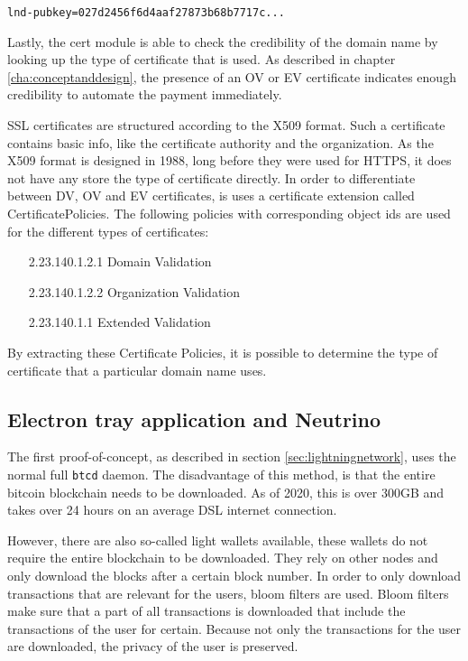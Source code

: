 \texttt{lnd-pubkey=027d2456f6d4aaf27873b68b7717c...}

Lastly, the cert module is able to check the credibility of the domain name by looking up the type of certificate that is used. As described in chapter \ref{cha:conceptanddesign}, the presence of an OV or EV certificate indicates enough credibility to automate the payment immediately. 

SSL certificates are structured according to the X509 format. Such a certificate contains basic info, like the certificate authority and the organization. As the X509 format is designed in 1988, long before they were used for HTTPS, it does not have any store the type of certificate directly. In order to differentiate between DV, OV and EV certificates, is uses a certificate extension called CertificatePolicies. The following policies with corresponding object ids are used for the different types of certificates:

\begin{enumerate}[leftmargin=8em]
  \item[2.23.140.1.2.1] Domain Validation
  \item[2.23.140.1.2.2] Organization Validation
  \item[2.23.140.1.1] Extended Validation
\end{enumerate}

By extracting these Certificate Policies, it is possible to determine the type of certificate that a particular domain name uses. 

\subsection{Electron tray application and Neutrino}
The first proof-of-concept, as described in section \ref{sec:lightningnetwork}, uses the normal full \texttt{btcd} daemon. The disadvantage of this method, is that the entire bitcoin blockchain needs to be downloaded. As of 2020, this is over 300GB and takes over 24 hours on an average DSL internet connection. 

However, there are also so-called light wallets available, these wallets do not require the entire blockchain to be downloaded. They rely on other nodes and only download the blocks after a certain block number. In order to only download transactions that are relevant for the users, bloom filters are used. Bloom filters make sure that a part of all transactions is downloaded that include the transactions of the user for certain. Because not only the transactions for the user are downloaded, the privacy of the user is preserved. 

